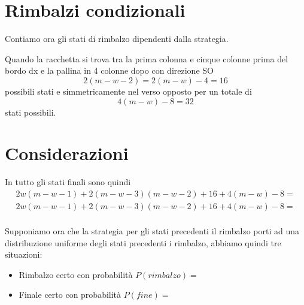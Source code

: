 \documentclass[a4paper,11pt]{article}
\begin{document}
\section{Rimbalzi condizionali}

Contiamo ora gli stati di rimbalzo dipendenti dalla strategia.

Quando la racchetta si trova tra la prima colonna e cinque colonne prima del bordo dx e la pallina in 4 colonne dopo con direzione SO
\[
2(m-w-2)=2(m-w)-4=16
\]
possibili stati e simmetricamente nel verso opposto per un totale di 
\[
4(m-w)-8 = 32
\] stati possibili.

\section{Considerazioni}

In tutto gli stati finali sono quindi 
\[
\begin{array}{c}
 2w(m-w-1)+2(m-w-3)(m-w-2)+16+4(m-w)-8= \\
 2w(m-w-1)+2(m-w-3)(m-w-2)+16+4(m-w)-8= \\
\end{array}
\]

Supponiamo ora che la strategia per gli stati precedenti il rimbalzo
porti ad una distribuzione uniforme degli stati precedenti i rimbalzo, abbiamo quindi tre situazioni:

\begin{itemize}
	\item 	
	Rimbalzo certo con probabilità $ P(rimbalzo)= $

	\item 	
	Finale certo con probabilità $ P(fine) = $
\end{itemize}
\end{document}
